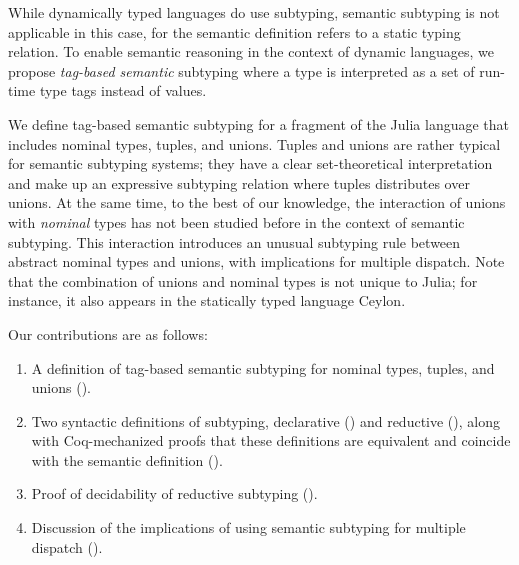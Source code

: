 While dynamically typed languages do use subtyping,
semantic subtyping is not applicable in this case,
for the semantic definition refers to a static typing relation.
To enable semantic reasoning in the context of dynamic languages,
we propose \emph{tag-based semantic} subtyping
where a type is interpreted as a set of run-time type tags 
instead of values. %

We define tag-based semantic subtyping for a fragment of the Julia language 
that includes nominal types, tuples, and unions.
Tuples and unions are rather typical for semantic subtyping systems;
they have a clear set-theoretical interpretation 
and make up an expressive subtyping relation
where tuples distributes over unions.
At the same time, to the best of our knowledge,
the interaction of unions with \emph{nominal} types has not been studied before
in the context of semantic subtyping.
This interaction introduces
an unusual subtyping rule between abstract nominal types and unions,
with implications for multiple dispatch.
Note that the combination of unions and nominal types is not unique to Julia;
for instance, it also appears in the statically typed language Ceylon.

Our contributions are as follows:
\begin{enumerate}
  \item A definition of tag-based semantic subtyping for 
    nominal types, tuples, and unions ().
  \item Two syntactic definitions of subtyping, 
    declarative () and reductive (),
    along with Coq-mechanized proofs that these definitions are equivalent
    and coincide with the semantic definition (). 	
  \item Proof of decidability of reductive subtyping ().
  \item Discussion of the implications of using semantic subtyping
    for multiple dispatch ().
\end{enumerate}






